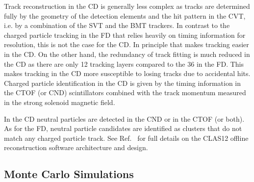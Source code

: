 \documentclass[final,3p,twocolumn]{elsarticle}
\begin{document}
Track reconstruction in the CD is generally less complex as tracks are determined fully by the geometry of the 
detection elements and the hit pattern in the CVT, i.e. by a combination of the SVT and the BMT trackers.  In
contrast to the charged particle tracking in the FD that relies heavily on timing information for resolution, this
is not the case for the CD. In principle that makes tracking easier in the CD. On the other hand, the redundancy
of track fitting is much reduced in the CD as there are only 12 tracking layers compared to the 36 in the FD. This
makes tracking in the CD more susceptible to losing tracks due to accidental hits. Charged particle identification
in the CD is given by the timing information in the CTOF (or CND) scintillators combined with the track momentum
measured in the strong solenoid magnetic field.

In the CD neutral particles are detected in the CND or in the CTOF (or both). As for the FD, neutral particle
candidates are identified as clusters that do not match any charged particle track. See Ref.~\cite{Software} for
full details on the CLAS12 offline reconstruction software architecture and design.



\subsection{Monte Carlo Simulations} 
\end{document}
